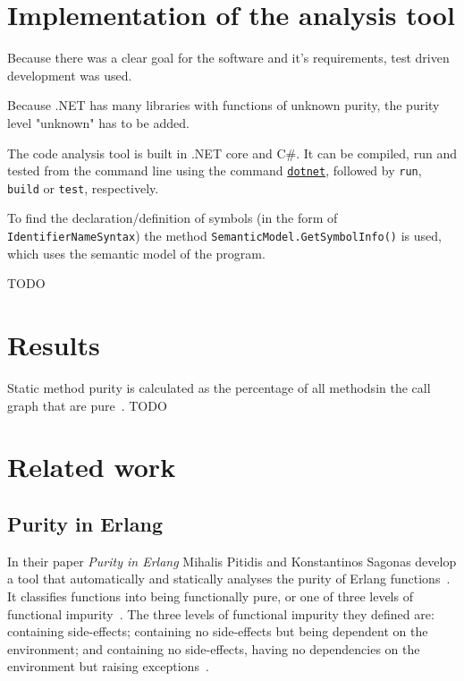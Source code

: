 \documentclass[a4paper,12pt]{article}
\begin{document}
\section{Implementation of the analysis tool} \label{sec:Implementation of the analysis tool}


Because there was a clear goal for the software and it's requirements, test driven development was used.

Because .NET has many libraries with functions of unknown purity, the purity level "unknown" has to be added.

The code analysis tool is built in .NET core and C\#. It can be compiled, run and tested from the command line using the command \href{https://docs.microsoft.com/en-us/dotnet/core/tools/}{\texttt{dotnet}}, followed by \texttt{run}, \texttt{build} or \texttt{test}, respectively.

To find the declaration/definition of symbols (in the form of \texttt{IdentifierNameSyn\allowbreak tax}) the method \texttt{SemanticModel.GetSym\allowbreak bolInfo()} is used, which uses the semantic model of the program.


TODO

\section{Results} \label{sec:Results}
Static method purity is calculated as the percentage of all methodsin the call graph that are pure~\cite{xu2007dynamic}.
TODO

\section{Related work} \label{sec:Related work} %

\subsection{Purity in Erlang} \label{sub:Purity-in-Erlang}
In their paper \textit{Purity in Erlang} Mihalis Pitidis and Konstantinos Sagonas develop a tool that automatically and statically analyses the purity of Erlang functions~\cite{pitidis2010purity}. It classifies functions into being functionally pure, or one of three levels of functional impurity~\cite{pitidis2010purity}.
The three levels of functional impurity they defined are: containing side-effects; containing no side-effects but being dependent on the environment; and containing no side-effects, having no dependencies on the environment but raising exceptions~\cite{pitidis2010purity}.
\end{document}
